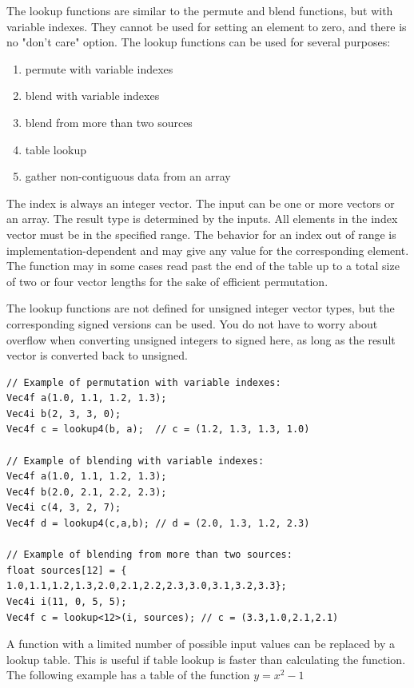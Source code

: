 \documentclass[vcl_manual.tex]{subfiles}
\begin{document}
The lookup functions are similar to the permute and blend functions, but with variable indexes. They cannot be used for setting an element to zero, and there is no "don't care" option. The lookup functions can be used for several purposes:

\begin{enumerate}
\item permute with variable indexes
\item blend with variable indexes
\item blend from more than two sources
\item table lookup
\item gather non-contiguous data from an array
\end{enumerate}

The index is always an integer vector. The input can be one or more vectors or an array. The result type is determined by the inputs. All elements in the index vector must be in the specified range. The behavior for an index out of range is implementation-dependent and may give any value for the corresponding element. The function may in some cases read past the end of the table up to a total size of two or four vector lengths for the sake of efficient permutation.

The lookup functions are not defined for unsigned integer vector types, but the corresponding signed versions can be used. You do not have to worry about overflow when converting unsigned integers to signed here, as long as the result vector is converted back to unsigned.


\begin{lstlisting}[frame=none]
// Example of permutation with variable indexes:
Vec4f a(1.0, 1.1, 1.2, 1.3);
Vec4i b(2, 3, 3, 0);
Vec4f c = lookup4(b, a);  // c = (1.2, 1.3, 1.3, 1.0)

// Example of blending with variable indexes:
Vec4f a(1.0, 1.1, 1.2, 1.3);
Vec4f b(2.0, 2.1, 2.2, 2.3);
Vec4i c(4, 3, 2, 7);
Vec4f d = lookup4(c,a,b); // d = (2.0, 1.3, 1.2, 2.3)

// Example of blending from more than two sources:
float sources[12] = {
1.0,1.1,1.2,1.3,2.0,2.1,2.2,2.3,3.0,3.1,3.2,3.3};
Vec4i i(11, 0, 5, 5);
Vec4f c = lookup<12>(i, sources); // c = (3.3,1.0,2.1,2.1)
\end{lstlisting}


A function with a limited number of possible input values can be replaced by a lookup table. This is useful if table lookup is faster than calculating the function. The following example has a table of the function $y = x^2 - 1$
\end{document}
